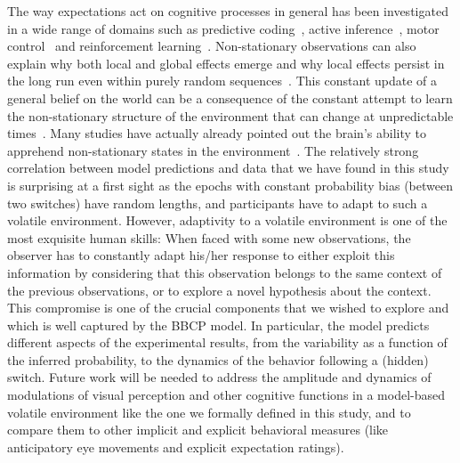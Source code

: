 \documentclass[10pt,letterpaper]{article}
\newcommand{\citep}[1]{\cite{#1}}
\newcommand{\Rone}[1]{\textbf{\textcolor{magenta}{[rev 1: #1]}}}
\begin{document}
The way expectations act on cognitive processes in general has been investigated in a wide range of domains such as predictive coding~\citep{Wacongne2012}, active inference~\citep{Friston2010}, motor control~\citep{WolpertGhahramani2000} and reinforcement learning~\citep{Behrens07,Wilson13,Damasse18}. Non-stationary observations can also explain why both local and global effects emerge and why local effects persist in the long run even within purely random sequences~\citep{Cho2002, Yu2009}. This constant update of a general belief on the world can be a consequence of the constant attempt to learn the non-stationary structure of the environment that can change at unpredictable times~\citep{Yu2009}. Many studies have actually already pointed out the brain's ability to apprehend non-stationary states in the environment~\citep{Ossmy2013, Meyniel15}.
The relatively strong correlation between model predictions and data that we have found in this study is surprising at a first sight
as the epochs with constant probability bias (between two switches) have random lengths,
and participants have to adapt to such a volatile environment.
However, adaptivity to a volatile environment is one of the most exquisite human skills:
When faced with some new observations,
the observer has to constantly adapt his/her response
to either exploit this information by considering that
this observation belongs to the same context of the previous observations, or to explore
a novel hypothesis about the context.
This compromise is one of the crucial components that we wished to explore
and which is well captured by the BBCP model.
In particular, the model predicts different aspects
of the experimental results,
from the variability as a function of the inferred probability,
to the dynamics of the behavior following a (hidden) switch.
Future work will be needed to address the amplitude and dynamics of modulations of visual perception and other cognitive functions in a model-based volatile environment like the one we formally defined in this study, and to compare them to other implicit and explicit behavioral measures (like anticipatory eye movements and explicit expectation ratings).
\end{document}
